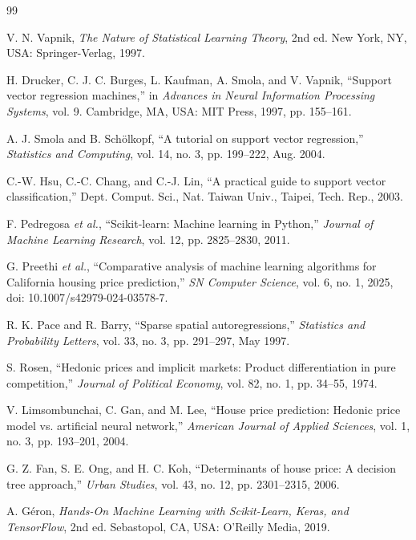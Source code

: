 \documentclass[pdflatex,sn-mathphys-num]{sn-jnl}
\begin{document}
\begin{thebibliography}{99}

V. N. Vapnik, \textit{The Nature of Statistical Learning Theory}, 2nd ed.
New York, NY, USA: Springer-Verlag, 1997.

H. Drucker, C. J. C. Burges, L. Kaufman, A. Smola, and V. Vapnik,
``Support vector regression machines,'' in \textit{Advances in Neural Information Processing Systems},
vol. 9. Cambridge, MA, USA: MIT Press, 1997, pp. 155--161.

A. J. Smola and B. Sch\"{o}lkopf,
``A tutorial on support vector regression,''
\textit{Statistics and Computing}, vol. 14, no. 3, pp. 199--222, Aug. 2004.

C.-W. Hsu, C.-C. Chang, and C.-J. Lin,
``A practical guide to support vector classification,''
Dept. Comput. Sci., Nat. Taiwan Univ., Taipei, Tech. Rep., 2003.

F. Pedregosa \textit{et al.},
``Scikit-learn: Machine learning in Python,''
\textit{Journal of Machine Learning Research}, vol. 12, pp. 2825--2830, 2011.

G. Preethi \textit{et al.},
``Comparative analysis of machine learning algorithms for California housing price prediction,''
\textit{SN Computer Science}, vol. 6, no. 1, 2025,
doi: 10.1007/s42979-024-03578-7.

R. K. Pace and R. Barry,
``Sparse spatial autoregressions,''
\textit{Statistics and Probability Letters}, vol. 33, no. 3, pp. 291--297, May 1997.

S. Rosen,
``Hedonic prices and implicit markets: Product differentiation in pure competition,''
\textit{Journal of Political Economy}, vol. 82, no. 1, pp. 34--55, 1974.

V. Limsombunchai, C. Gan, and M. Lee,
``House price prediction: Hedonic price model vs. artificial neural network,''
\textit{American Journal of Applied Sciences}, vol. 1, no. 3, pp. 193--201, 2004.

G. Z. Fan, S. E. Ong, and H. C. Koh,
``Determinants of house price: A decision tree approach,''
\textit{Urban Studies}, vol. 43, no. 12, pp. 2301--2315, 2006.

A. G\'{e}ron,
\textit{Hands-On Machine Learning with Scikit-Learn, Keras, and TensorFlow},
2nd ed. Sebastopol, CA, USA: O'Reilly Media, 2019.


\end{thebibliography}
\end{document}
